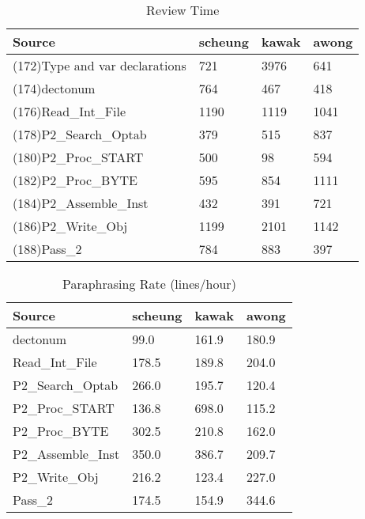 \begin{table}[hb]
\begin{center}
\begin{tabular}{|l|l|l|l|}
\hline
Source & scheung & kawak & awong\\
\hline
(172)Type and var declarations & 721 & 3976 & 641\\
(174)dectonum & 764 & 467 & 418\\
(176)Read\_Int\_File & 1190 & 1119 & 1041\\
(178)P2\_Search\_Optab & 379 & 515 & 837\\
(180)P2\_Proc\_START & 500 & 98 & 594\\
(182)P2\_Proc\_BYTE & 595 & 854 & 1111\\
(184)P2\_Assemble\_Inst & 432 & 391 & 721\\
(186)P2\_Write\_Obj & 1199 & 2101 & 1142\\
(188)Pass\_2 & 784 & 883 & 397\\
\hline
\end{tabular}
\end{center}
\caption{Review Time}
\end{table}

\begin{table}[hb]
\begin{center}
\begin{tabular}{|l|l|l|l|}
\hline
Source & scheung & kawak & awong\\
\hline
dectonum & 99.0 & 161.9 & 180.9\\
Read\_Int\_File & 178.5 & 189.8 & 204.0\\
P2\_Search\_Optab & 266.0 & 195.7 & 120.4\\
P2\_Proc\_START & 136.8 & 698.0 & 115.2\\
P2\_Proc\_BYTE & 302.5 & 210.8 & 162.0\\
P2\_Assemble\_Inst & 350.0 & 386.7 & 209.7\\
P2\_Write\_Obj & 216.2 & 123.4 & 227.0\\
Pass\_2 & 174.5 & 154.9 & 344.6\\
\hline
\end{tabular}
\end{center}
\caption{Paraphrasing Rate (lines/hour)}
\end{table}


